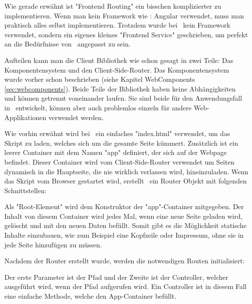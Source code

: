 
Wie gerade erwähnt ist "Frontend Routing" ein bisschen komplizierter zu implementieren. Wenn man kein Framework wie \zb: Angular verwendet, muss man praktisch alles selbst implementieren. Trotzdem wurde bei \ZELIA\ kein Framework verwendet, sondern  ein eigenes kleines "Frontend Service" geschrieben, um perfekt an die Bedürfnisse von \ZELIA\ angepasst zu sein.

Aufteilen kann man die Client Bibliothek wie schon gesagt in zwei Teile: Das Komponentensystem und den Client-Side-Router. Das Komponentensystem wurde vorher schon beschrieben (siehe Kapitel WebComponents \ref{sec:webcomponents}). Beide Teile der Bibliothek haben keine Abhängigkeiten und können getrennt voneinander laufen. Sie sind beide für den Anwendungsfall in \ZELIA\ entwickelt, können aber auch problemlos einzeln für andere Web-Applikationen verwendet werden.

Wie vorhin erwähnt wird bei \ZELIA\ ein einfaches "index.html" verwendet, um das Skript zu laden, welches sich um die gesamte Seite kümmert. Zusätzlich ist ein leerer Container mit dem Namen "app" definiert, der sich auf der Webpage befindet. Dieser Container wird vom Client-Side-Router verwendet um Seiten dynamisch in die Hauptseite, die nie wirklich verlassen wird, hineinzuladen. Wenn das Skript vom Browser gestartet wird, erstellt \ZELIA\ ein Router Objekt mit folgenden Schnittstellen:


Als "Root-Element" wird dem Konstruktor der "app"-Container mitgegeben. Der Inhalt von diesem Container wird jedes Mal, wenn eine neue Seite geladen wird, gelöscht und mit den neuen Daten befüllt. Somit gibt es die Möglichkeit statische Inhalte einzubauen, wie zum Beispiel eine Kopfzeile oder Impressum, ohne sie in jede Seite hinzufügen zu müssen.

Nachdem der Router erstellt wurde, werden die notwendigen Routen initialisiert:



Der erste Parameter ist der Pfad und der Zweite ist der Controller, welcher ausgeführt wird, wenn der Pfad aufgerufen wird. Ein Controller ist in diesem Fall eine einfache Methode, welche den App-Container befüllt.


